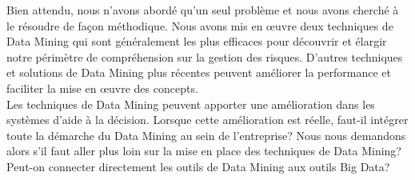 \documentclass[11pt,a4paper]{report}
\begin{document}
Bien attendu, nous n'avons abordé qu'un seul problème et nous avons cherché à le résoudre de façon méthodique. Nous avons mis en œuvre deux techniques de Data Mining qui sont généralement les plus efficaces pour découvrir et élargir notre périmètre de compréhension sur la gestion des risques. D'autres techniques et solutions de Data Mining  plus récentes peuvent améliorer la performance et faciliter la mise en œuvre des concepts. \\

Les techniques de Data Mining peuvent apporter une amélioration dans les systèmes d'aide à la décision. Lorsque cette amélioration est réelle, faut-il intégrer toute la démarche du Data Mining au sein de l'entreprise? Nous nous demandons alors s'il faut aller plus loin sur la mise en place des techniques de Data Mining? Peut-on connecter directement les outils de Data Mining aux outils Big Data?

 \newpage
 

\newpage
\end{document}
